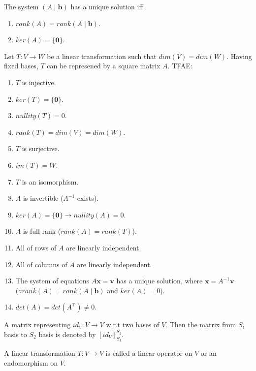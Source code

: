 \documentclass[12pt]{article}
\begin{document}
\begin{corollary}
    The system $(A\mid\mathbf{b})$ has a unique solution iff
    \begin{enumerate}
        \item $rank(A)=rank(A\mid\mathbf{b})$.
        \item $ker(A)=\{\mathbf{0}\}$.
    \end{enumerate}
\end{corollary}

\begin{theorem}[TFAE]
Let $T:V\rightarrow W$ be a linear transformation such that $dim(V)=dim(W)$.
Having fixed bases, $T$ can be represened by a square matrix $A$.
TFAE:
\begin{enumerate}
    \item $T$ is injective.
    \item $ker(T)=\{\mathbf{0}\}$.
    \item $nullity(T)=0$.
    \item $rank(T)=dim(V)=dim(W)$.
    \item $T$ is surjective.
    \item $im(T)=W$.
    \item $T$ is an isomorphism.
    \item $A$ is invertible ($A^{-1}$ exists).
    \item $ker(A)=\{\mathbf{0}\}\rightarrow nullity(A)=0$.
    \item $A$ is full rank ($rank(A)=rank(T)$).
    \item All of rows of $A$ are linearly independent.
    \item All of columns of $A$ are linearly independent.
    \item The system of equations $A\mathbf{x}=\mathbf{v}$ has a unique solution, where $\mathbf{x}=A^{-1}\mathbf{v}$\\
     ($\because rank(A) = rank(A\mid\mathbf{b})$ and $ker(A)=0$).
    \item $det(A)=det(A^\top)\neq 0.$
\end{enumerate}
\label{TFAE_ver1}
\end{theorem}


\begin{definition}
    A matrix representing $id_V: V\rightarrow V$ w.r.t two bases of $V$.
    Then the matrix from $S_1$ basis to $S_2$ basis is denoted by $[id_V]^{S_2}_{S_1}.$ 
\end{definition}

\begin{definition}
    A linear transformation $T:V\rightarrow V$ is called a linear operator on $V$ or an endomorphism on $V$. 
\end{definition}
\end{document}

